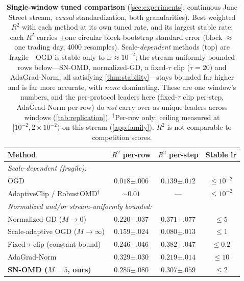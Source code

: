\documentclass{article}
\begin{document}
\begin{table}[htbp]
\caption{\textbf{Single-window tuned comparison} (\cref{sec:experiments}; continuous Jane
Street stream, \emph{causal} standardization, both granularities). Best weighted $R^2$ with
each method at its own tuned rate, and its largest stable rate; each $R^2$ carries $\pm$one
circular block-bootstrap standard error (block $\approx$ one trading day, $4000$ resamples).
Scale-\emph{dependent} methods (top) are fragile---OGD is stable only to
$\mathrm{lr}\!\approx\!10^{-2}$; the stream-uniformly bounded rows below---SN-OMD,
normalized-GD, a fixed-$\tau$ clip ($\tau{=}20$) and AdaGrad-Norm, all satisfying
\cref{thm:stability}---stays bounded far higher and is far more accurate, with \emph{none}
dominating. These are one window's numbers, and the per-protocol leaders here (fixed-$\tau$
clip per-step, AdaGrad-Norm per-row) do \emph{not} carry over as unique leaders across windows
(\cref{tab:replication}). $^\dagger$Per-row only; ceiling measured at $[10^{-2},2\!\times\!10^{-2})$
on this stream (\cref{app:family}). $R^2$ is not comparable to competition scores.}
\label{tab:jane}
\centering
\begin{small}
\setlength{\tabcolsep}{3.5pt}
\begin{tabular}{lccc}
\toprule
Method & $R^2$ per-row & $R^2$ per-step & Stable lr \\
\midrule
\multicolumn{4}{l}{\emph{Scale-dependent (fragile):}}\\
OGD                                  & $0.018{\scriptscriptstyle\pm.006}$ & $0.139{\scriptscriptstyle\pm.012}$ & $\le 10^{-2}$ \\
AdaptiveClip / RobustOMD$^\dagger$   & $\sim0.01$ & --- & $\le 10^{-2}$ \\
\midrule
\multicolumn{4}{l}{\emph{Normalized and/or stream-uniformly bounded:}}\\
Normalized-GD ($M\!\to\!0$)          & $0.220{\scriptscriptstyle\pm.037}$ & $0.371{\scriptscriptstyle\pm.077}$ & $\le 5$ \\
Scale-adaptive OGD ($M\!\to\!\infty$)& $0.159{\scriptscriptstyle\pm.024}$ & $0.080{\scriptscriptstyle\pm.013}$ & $\le 1$ \\
Fixed-$\tau$ clip (constant bound)   & $0.246{\scriptscriptstyle\pm.046}$ & $\mathbf{0.382}{\scriptscriptstyle\pm.047}$ & $\le 0.2$ \\
AdaGrad-Norm                         & $\mathbf{0.329}{\scriptscriptstyle\pm.030}$ & $0.219{\scriptscriptstyle\pm.014}$ & $\le 10$ \\
\textbf{SN-OMD ($M{=}5$, ours)}      & $0.285{\scriptscriptstyle\pm.080}$ & $0.307{\scriptscriptstyle\pm.059}$ & $\le 2$ \\
\bottomrule
\end{tabular}
\end{small}
\end{table}
\end{document}
